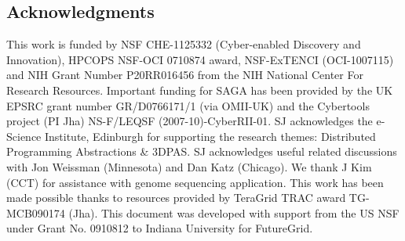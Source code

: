 \documentclass{acm_proc_article-sp}
\newcommand{\upp}{\vspace*{-0.5em}}
\begin{document}
\upp
\subsection*{Acknowledgments}
\scriptsize This work is funded by NSF CHE-1125332 (Cyber-enabled
Discovery and Innovation), HPCOPS NSF-OCI 0710874 award, NSF-ExTENCI
(OCI-1007115) and NIH Grant Number P20RR016456 from the NIH National
Center For Research Resources. Important funding for SAGA has been
provided by the UK EPSRC grant number GR/D0766171/1 (via OMII-UK) and
the Cybertools project (PI Jha) NS-F/LEQSF (2007-10)-CyberRII-01. SJ
acknowledges the e-Science Institute, Edinburgh for supporting the
research themes: Distributed Programming Abstractions \& 3DPAS. SJ 
acknowledges useful related discussions with Jon Weissman (Minnesota)
and Dan Katz (Chicago). We thank J Kim (CCT) for assistance with
genome sequencing application. This work has been made possible
thanks to resources provided by TeraGrid TRAC award
TG-MCB090174 (Jha). This document was developed with support from the
US NSF under Grant No. 0910812 to Indiana University for FutureGrid.
\end{document}

